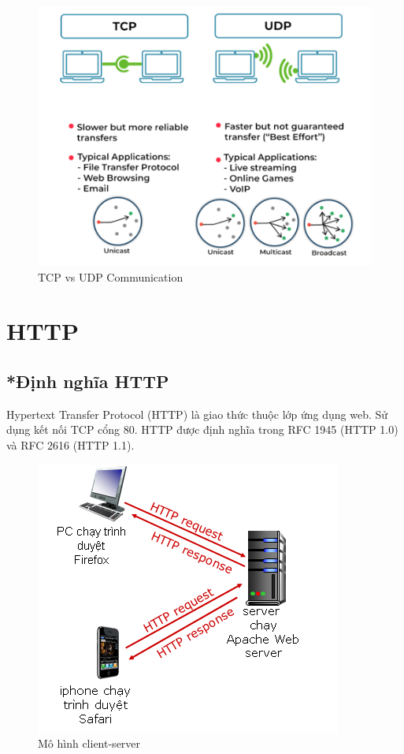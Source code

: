 \documentclass[APA,STIX1COL]{WileyNJD-v2}
\begin{document}
  \begin{figure}[h]
    \centering
    \includegraphics[width=15cm]{tcp_udp_1}
    \caption{TCP vs UDP Communication}
    \label{fig:tcpvsudp1}
  \end{figure}

\section{HTTP}\label{sec2}
\subsection*{*Định nghĩa HTTP}
Hypertext Transfer Protocol (HTTP) là giao thức thuộc lớp ứng dụng web. Sử dụng kết nối TCP cổng 80. HTTP được định nghĩa trong RFC 1945 (HTTP 1.0) và RFC 2616 (HTTP 1.1).

\begin{figure}[h]
  \centering
  \includegraphics[scale=0.7]{http}
  \caption{Mô hình client-server}
  \label{fig:http}
\end{figure}
\end{document}
